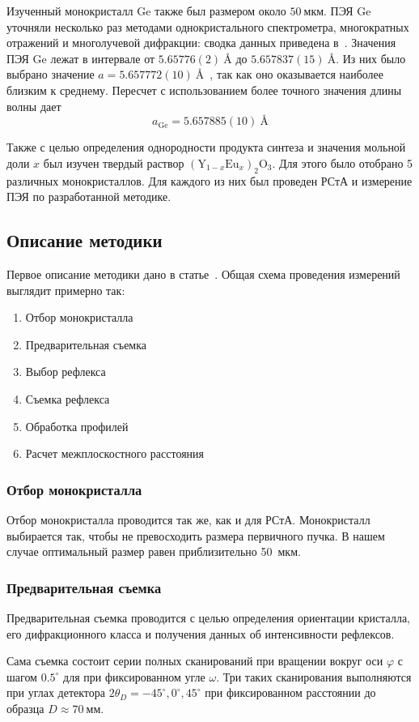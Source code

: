 \documentclass[a4paper,14pt]{extarticle}
\newcommand{\unit}[1]{ \ \text{#1}}
\newcommand{\degree}{^\circ}
\newcommand{\YEu}{${(\text{Y}_{1-x}\text{Eu}_x)}_2\text{O}_3$}
\newcounter{x}
\begin{document}
Изученный монокристалл Ge также был размером около $50 \unit{мкм}$.
ПЭЯ Ge уточняли несколько раз методами однокристального спектрометра, многократных отражений и многолучевой дифракции: сводка данных приведена в~\cite{Lisoivan:1982}.
Значения ПЭЯ Ge лежат в интервале от $5.65776 (2) \unit{\AA}$ до $5.657837 (15) \unit{\AA}$.
Из них было выбрано значение $a = 5.657772 (10) \unit{\AA}$~\cite{Cooper:1962}, так как оно оказывается наиболее близким к среднему.
Пересчет с использованием более точного значения длины волны дает
\[ a_\text{Ge} = 5.657885 (10)\unit{\AA} \]

Также с целью определения однородности продукта синтеза и значения мольной доли $x$ был изучен твердый раствор \YEu.
Для этого было отобрано 5 различных монокристаллов.
Для каждого из них был проведен РСтА и измерение ПЭЯ по разработанной методике.

\subsection{Описание методики}

Первое описание методики дано в статье~\cite{Kudryavtsev:2024:YEu}.
Общая схема проведения измерений выглядит примерно так:
\begin{enumerate}
    \item Отбор монокристалла
    \item Предварительная съемка
    \item Выбор рефлекса
    \item Съемка рефлекса
    \item Обработка профилей
    \item Расчет межплоскостного расстояния
\end{enumerate}
\subsubsection{Отбор монокристалла}
Отбор монокристалла проводится так же, как и для РСтА.
Монокристалл выбирается так, чтобы не превосходить размера первичного пучка.
В нашем случае оптимальный размер равен приблизительно 50~мкм.
\subsubsection{Предварительная съемка}
Предварительная съемка проводится с целью определения ориентации кристалла, его дифракционного класса и получения данных об интенсивности рефлексов.

Сама съемка состоит серии полных сканирований при вращении вокруг оси $\varphi$ с шагом $0.5\degree$ для при фиксированном угле $\omega$.
Три таких сканирования выполняются при углах детектора $2\theta_D = -45\degree, 0\degree, 45\degree$ при фиксированном расстоянии до образца $D \approx 70\unit{мм}$.
\end{document}
